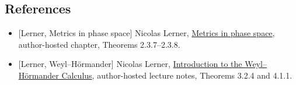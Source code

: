 \documentclass[
  11pt,
]{article}
\providecommand{\tightlist}{%
  \setlength{\itemsep}{0pt}\setlength{\parskip}{0pt}}
\begin{document}
\subsection{References}\label{references}

\begin{itemize}
\tightlist
\item
  {[}Lerner, Metrics in phase space{]} Nicolas Lerner,
  \href{https://webusers.imj-prg.fr/~nicolas.lerner/ch2booklerner.pdf}{Metrics
  in phase space}, author-hosted chapter, Theorems 2.3.7--2.3.8.
\item
  {[}Lerner, Weyl--Hörmander{]} Nicolas Lerner,
  \href{https://webusers.imj-prg.fr/~nicolas.lerner/PSEUDO.2005.pdf}{Introduction
  to the Weyl--Hörmander Calculus}, author-hosted lecture notes,
  Theorems 3.2.4 and 4.1.1.
\end{itemize}
\end{document}

